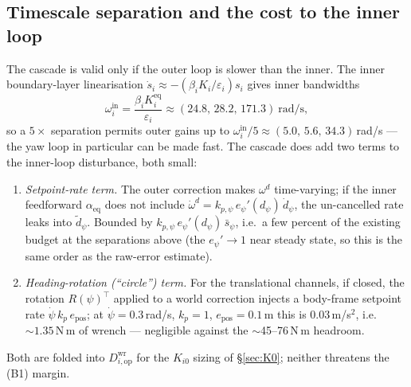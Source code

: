 \documentclass[11pt]{article}
\theoremstyle{plain}
\theoremstyle{definition}
\newcommand{\Dwr}{D^{\mathrm{wr}}}
\begin{document}
\subsection{Timescale separation and the cost to the inner loop}
The cascade is valid only if the outer loop is slower than the inner. The inner
boundary-layer linearisation $\dot s_i\approx-(\beta_iK_i/\varepsilon_i)s_i$ gives
inner bandwidths
\begin{equation}
\omega^{\mathrm{in}}_i=\frac{\beta_iK_i^{\mathrm{eq}}}{\varepsilon_i}
\approx(24.8,\,28.2,\,171.3)\ \text{rad/s},
\end{equation}
so a $5\times$ separation permits outer gains up to
$\omega^{\mathrm{in}}_i/5\approx(5.0,\,5.6,\,34.3)\,$rad/s --- the yaw loop in
particular can be made fast. The cascade does add two terms to the inner-loop
disturbance, both small:
\begin{enumerate}[leftmargin=2em]
\item \emph{Setpoint-rate term.} The outer correction makes $\omega^d$ time-varying;
if the inner feedforward $\alpha_{\mathrm{eq}}$ does not include
$\dot\omega^d=k_{p,\psi}\,e_\psi'(d_\psi)\,\dot d_\psi$, the un-cancelled rate leaks into
$\tilde d_\psi$. Bounded by $k_{p,\psi}\,e_\psi'(d_\psi)\,\bar s_\psi$, i.e.\ a few
percent of the existing budget at the separations above (the $e_\psi'\to1$ near steady
state, so this is the same order as the raw-error estimate).
\item \emph{Heading-rotation (``circle'') term.} For the translational channels, if
closed, the rotation $R(\psi)^\top$ applied to a world correction injects a body-frame
setpoint rate $\dot\psi\,k_p\,e_{\mathrm{pos}}$; at $\dot\psi=0.3\,$rad/s,
$k_p=1$, $e_{\mathrm{pos}}=0.1\,$m this is $0.03\,$m/s$^2$, i.e.\ ${\sim}1.35\,$N\,m of
wrench --- negligible against the $\sim$45--76\,N\,m headroom.
\end{enumerate}
Both are folded into $\Dwr_{i,\mathrm{op}}$ for the $K_{i0}$ sizing of
\S\ref{sec:K0}; neither threatens the (B1) margin.
\end{document}
